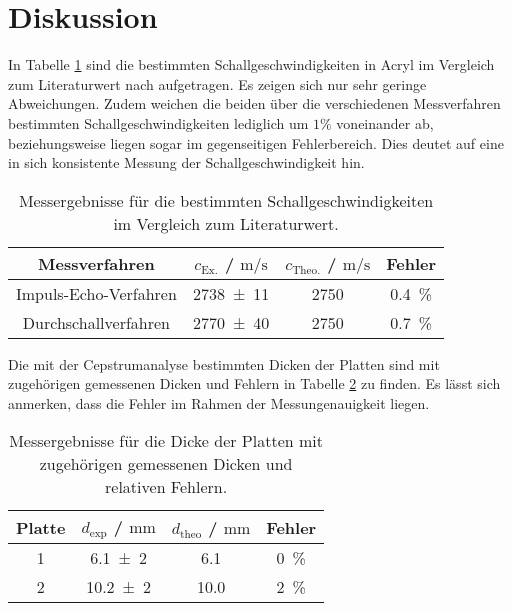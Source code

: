 \section{Diskussion}
\label{sec:Diskussion}
In Tabelle \ref{tab:schall} sind die bestimmten Schallgeschwindigkeiten in Acryl im Vergleich zum Literaturwert nach \cite{schall} aufgetragen.
Es zeigen sich nur sehr geringe Abweichungen. Zudem weichen die beiden über die verschiedenen Messverfahren bestimmten Schallgeschwindigkeiten lediglich um $1\%$ voneinander ab, beziehungsweise liegen sogar im gegenseitigen Fehlerbereich.
Dies deutet auf eine in sich konsistente Messung der Schallgeschwindigkeit hin.
\begin{table}
	\centering
	\caption{Messergebnisse für die bestimmten Schallgeschwindigkeiten im Vergleich zum Literaturwert.}
	\label{tab:schall}
	\begin{tabular}{cccc}
	\toprule
		Messverfahren& $c_\mathrm{Ex.}$ / $\si{\meter\per\second}$ & $c_\mathrm{Theo.}$ / $\si{\meter\per\second}$ & Fehler \\
	\midrule
	Impuls-Echo-Verfahren&\num{2738(11)}&\num{2750}&\SI{0.4}{\percent}\\
	Durchschallverfahren&\num{2770(40)}&\num{2750}&\SI{0.7}{\percent}\\
	\bottomrule
	\end{tabular}
\end{table}

Die mit der Cepstrumanalyse bestimmten Dicken der Platten sind mit zugehörigen gemessenen Dicken
und Fehlern in Tabelle \ref{tab:cepstru} zu finden.
Es lässt sich anmerken, dass die Fehler im Rahmen der Messungenauigkeit liegen.
\begin{table}
	\centering
	\caption{Messergebnisse für die Dicke der Platten mit zugehörigen gemessenen Dicken und relativen Fehlern.}
	\label{tab:cepstru}
	\begin{tabular}{cccc}
	\toprule
		Platte & $d_{\mathrm{exp}}$ / $\si{\milli\meter}$ & $d_{\mathrm{theo}}$ / $\si{\milli\meter}$ & Fehler \\
	\midrule
		1 & \num{6,1(2)}& \num{6,1}& \SI{0}{\percent} \\
		2 & \num{10,2(2)}& \num{10,0}& \SI{2}{\percent} \\
	\bottomrule
	\end{tabular}
\end{table}

